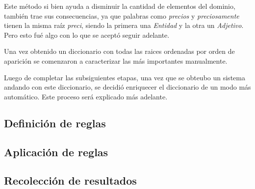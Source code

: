 Este método si bien ayuda a disminuir la cantidad de elementos del dominio, también trae sus consecuencias, ya que palabras como \emph{precios} y \emph{preciosamente} tienen la misma raíz \emph{preci}, siendo la primera una \emph{Entidad} y la otra un \emph{Adjetivo}. Pero esto fué algo con lo que se aceptó seguir adelante.

Una vez obtenido un diccionario con todas las raices ordenadas por orden de aparición se comenzaron a caracterizar las más importantes manualmente.

Luego de completar las subsiguientes etapas, una vez que se obteubo un sistema andando con este diccionario, se decidió enriquecer el diccionario de un modo más automático. Este proceso será explicado más adelante.


\subsection{Definición de reglas}



\subsection{Aplicación de reglas}



\subsection{Recolección de resultados}

